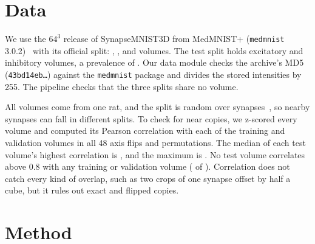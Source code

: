 \documentclass[conference]{IEEEtran}
\newif\ifanycitation
\let\citeAnyKey\cite
\renewcommand{\cite}{\global\anycitationtrue\citeAnyKey}
\begin{document}


\section{Data}
\label{sec:data}

We use the $64^3$ release of SynapseMNIST3D from MedMNIST+ (\texttt{medmnist}
3.0.2)~\cite{yang2024medmnistplus} with its official split: \nTrain{}, \nVal{}, and \nTest{}
volumes. The test split holds \nTestExc{} excitatory and \nTestInh{} inhibitory volumes, a
prevalence of \prevalence{}. Our data module checks the archive's MD5 (\texttt{43bd14eb\ldots}) against the
\texttt{medmnist} package and divides the stored intensities by 255. The pipeline checks that the three splits share no volume.

All volumes come from one rat, and the split is random over
synapses~\cite{yang2023medmnist}, so nearby synapses can fall in different splits. To check
for near copies, we z-scored every volume and computed its Pearson correlation with each of
the \dupRef{} training and validation volumes in all 48 axis flips and permutations. The
median of each test volume's highest correlation is \dupMedian{}, and the maximum is
\dupMax{}. No test volume correlates above 0.8 with any training or validation volume
(\dupCount{} of \nTest{}). Correlation does not catch every kind of overlap, such as two
crops of one synapse offset by half a cube, but it rules out exact and flipped copies.

\section{Method}
\label{sec:method}
\end{document}
